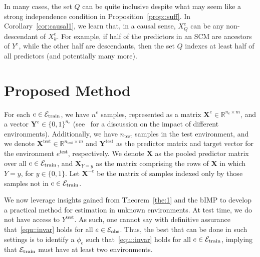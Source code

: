 \documentclass[conference,letterpaper]{IEEEtran}
\begin{document}
In many cases, the set $Q$ can be quite inclusive despite what may seem like a strong independence condition in Proposition~\ref{prop::suff}. In Corollary~\ref{cor:causal1}, we learn that, in a causal sense, $X_Q^{e}$ can be any non-descendant of $X_k^e$. For example, if half of the predictors in an SCM are ancestors of $Y^e$, while the other half are descendants, then the set $Q$ indexes at least half of all predictors (and potentially many more).



\section{Proposed Method}
For each $e\in\mathcal{E}_{\text{train}}$, we have $n^e$ samples, represented as a matrix $\bm{X}^e\in\mathbb{R}^{n_e\times m}$, and a vector $\bm{Y}^e\in \{0,1\}^{n_e}$ (see~\cite{goddard2023error} for a discussion on the impact of different environments). Additionally, we have $n_{\text{test}}$ samples in the test environment, and we denote $\bm{X}^{\text{test}}\in\mathbb{R}^{n_{\text{test}}\times m}$ and $\bm{Y}^{\text{test}}$ as the predictor matrix and target vector for the environment $e^{\text{test}}$, respectively. We denote $\bm{X}$ as the pooled predictor matrix over all $e\in\mathcal{E}_{\text{train}}$, and $\bm{X}_{Y=y}$ as the matrix comprising the rows of $\bm{X}$ in which $Y=y$, for $y\in\{0,1\}$. Let $\bm{X}^{-e}$ be the matrix of samples indexed only by those samples not in $e\in\mathcal{E}_{\text{train}}$. 

We now leverage insights gained from Theorem~\ref{the:1} and the bIMP to develop a practical method for estimation in unknown environments. At test time, we do not have access to $Y^{\text{test}}$. As such, one cannot say with definitive assurance that~\eqref{equ::invar} holds for all $e\in\mathcal{E}_{\text{obs}}$. Thus, the best that can be done in such settings is to identify a $\phi_e$ such that~\eqref{equ::invar} holds for all $e\in\mathcal{E}_{\text{train}}$, implying that $\mathcal{E}_{\text{train}}$ must have at least two environments.
\end{document}
